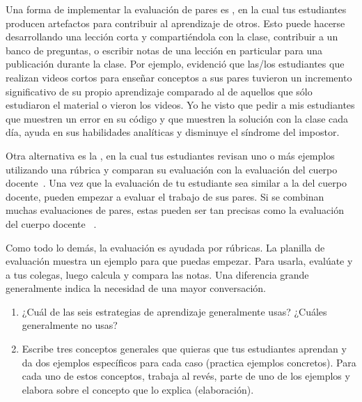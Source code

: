Una forma de implementar la evaluación de pares es ,
en la cual tus estudiantes producen artefactos para contribuir al aprendizaje de otros.
Esto puede hacerse desarrollando una lección corta y compartiéndola con la clase,
contribuir a un banco de preguntas,
o escribir notas de una lección en particular para una publicación durante la clase.
Por ejemplo,
\cite{Fran2018} evidenció que las/los estudiantes que realizan videos cortos para enseñar conceptos a sus pares
tuvieron un incremento significativo de su propio aprendizaje
comparado al de aquellos que sólo estudiaron el material o vieron los videos.
Yo he visto que pedir a mis estudiantes que muestren un error en su código y que muestren la solución con la clase cada día,
ayuda en sus habilidades analíticas y disminuye el síndrome del impostor.

Otra alternativa es la ,
en la cual tus estudiantes revisan uno o más ejemplos utilizando una rúbrica
y comparan su evaluación con la evaluación del cuerpo docente~\cite{Kulk2013}.
Una vez que la evaluación de tu estudiante sea similar a la del cuerpo docente,
pueden empezar a evaluar el trabajo de sus pares.
Si se combinan muchas evaluaciones de pares,
estas pueden ser tan precisas como la evaluación del cuerpo docente ~\cite{Pare2008}.

Como todo lo demás,
la evaluación es ayudada por rúbricas.
La planilla de evaluación  muestra un ejemplo para que puedas empezar.
Para usarla,
evalúate y a tus colegas,
luego calcula y compara las notas.
Una diferencia grande generalmente indica la necesidad de una mayor conversación.



\begin{enumerate}

\item
  ¿Cuál de las seis estrategias de aprendizaje generalmente usas?
  ¿Cuáles generalmente no usas?

\item
  Escribe tres conceptos generales que quieras que tus estudiantes aprendan
  y da dos ejemplos específicos para cada caso
  (practica ejemplos concretos).
  Para cada uno de estos conceptos,
  trabaja al revés, parte de uno de los ejemplos y elabora sobre el concepto que lo explica
  (elaboración).

\end{enumerate}

